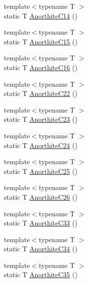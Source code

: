 \begin{DoxyCompactItemize}
\item 
{\footnotesize template$<$typename T $>$ }\\static T \mbox{\hyperlink{namespacempc_1_1data_a93d953b94e88a7998c13754d797834be}{Anorthite\+C14}} ()
\item 
{\footnotesize template$<$typename T $>$ }\\static T \mbox{\hyperlink{namespacempc_1_1data_ac3ef24ff627dcc26c4d87030c5513af9}{Anorthite\+C15}} ()
\item 
{\footnotesize template$<$typename T $>$ }\\static T \mbox{\hyperlink{namespacempc_1_1data_ada0c7e7ee3acf3998cfaa3a9183c0cae}{Anorthite\+C16}} ()
\item 
{\footnotesize template$<$typename T $>$ }\\static T \mbox{\hyperlink{namespacempc_1_1data_a14fcfd3f4f6fdb2a23003a3e1b4063f5}{Anorthite\+C22}} ()
\item 
{\footnotesize template$<$typename T $>$ }\\static T \mbox{\hyperlink{namespacempc_1_1data_a68db2cfdb2ca70be269855a319bcb39a}{Anorthite\+C23}} ()
\item 
{\footnotesize template$<$typename T $>$ }\\static T \mbox{\hyperlink{namespacempc_1_1data_a1368e877e57345cd2293ce7812046f6a}{Anorthite\+C24}} ()
\item 
{\footnotesize template$<$typename T $>$ }\\static T \mbox{\hyperlink{namespacempc_1_1data_a61e902e6c095b9c860c75321a8c5685e}{Anorthite\+C25}} ()
\item 
{\footnotesize template$<$typename T $>$ }\\static T \mbox{\hyperlink{namespacempc_1_1data_aea565664af21c893696ef12e775681ff}{Anorthite\+C26}} ()
\item 
{\footnotesize template$<$typename T $>$ }\\static T \mbox{\hyperlink{namespacempc_1_1data_a0719f9e8928aa464328f15e4dab004af}{Anorthite\+C33}} ()
\item 
{\footnotesize template$<$typename T $>$ }\\static T \mbox{\hyperlink{namespacempc_1_1data_a69c2b40eabe6b2e0db91f16326e6940e}{Anorthite\+C34}} ()
\item 
{\footnotesize template$<$typename T $>$ }\\static T \mbox{\hyperlink{namespacempc_1_1data_a8ac5e7981bc0ee65e296fe0c55000178}{Anorthite\+C35}} ()
\item 

\end{DoxyCompactItemize}
